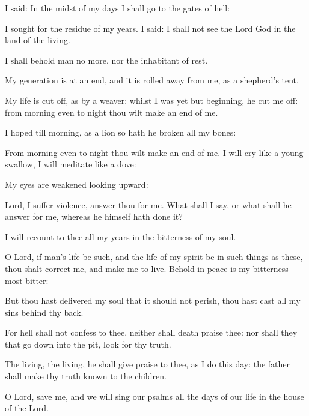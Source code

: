 \item I said: In the midst of my days I shall go to the gates of hell:
\item I sought for the residue of my years. I said: I shall not see the Lord God in the land of the living.
\item I shall behold man no more, nor the inhabitant of rest.
\item My generation is at an end, and it is rolled away from me, as a shepherd’s tent.
\item My life is cut off, as by a weaver: whilst I was yet but beginning, he cut me off: from morning even to night thou wilt make an end of me.
\item I hoped till morning, as a lion so hath he broken all my bones:
\item From morning even to night thou wilt make an end of me. I will cry like a young swallow, I will meditate like a dove:
\item My eyes are weakened looking upward:
\item Lord, I suffer violence, answer thou for me. What shall I say, or what shall he answer for me, whereas he himself hath done it?
\item I will recount to thee all my years in the bitterness of my soul.
\item O Lord, if man’s life be such, and the life of my spirit be in such things as these, thou shalt correct me, and make me to live. Behold in peace is my bitterness most bitter:
\item But thou hast delivered my soul that it should not perish, thou hast cast all my sins behind thy back.
\item For hell shall not confess to thee, neither shall death praise thee: nor shall they that go down into the pit, look for thy truth.
\item The living, the living, he shall give praise to thee, as I do this day: the father shall make thy truth known to the children.
\item O Lord, save me, and we will sing our psalms all the days of our life in the house of the Lord.
